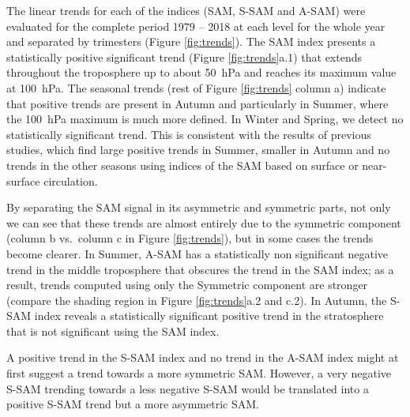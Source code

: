 \documentclass[smallextended]{svjour3}       %
\begin{document}
The linear trends for each of the indices (SAM, S\nobreakdash-SAM and A\nobreakdash-SAM) were evaluated for the complete period 1979 -- 2018 at each level for the whole year and separated by trimesters (Figure \ref{fig:trends}).
The SAM index presents a statistically positive significant trend (Figure \ref{fig:trends}a.1) that extends throughout the troposphere up to about 50~hPa and reaches its maximum value at 100~hPa.
The seasonal trends (rest of Figure \ref{fig:trends} column a) indicate that positive trends are present in Autumn and particularly in Summer, where the 100~hPa maximum is much more defined.
In Winter and Spring, we detect no statistically significant trend.
This is consistent with the results of previous studies, which find large positive trends in Summer, smaller in Autumn and no trends in the other seasons \citep[e.g.][ and references therein]{fogt2020} using indices of the SAM based on surface or near-surface circulation.

By separating the SAM signal in its asymmetric and symmetric parts, not only we can see that these trends are almost entirely due to the symmetric component (column b vs.~column c in Figure \ref{fig:trends}), but in some cases the trends become clearer.
In Summer, A\nobreakdash-SAM has a statistically non significant negative trend in the middle troposphere that obscures the trend in the SAM index; as a result, trends computed using only the Symmetric component are stronger (compare the shading region in Figure \ref{fig:trends}a.2 and c.2).
In Autumn, the S\nobreakdash-SAM index reveals a statistically significant positive trend in the stratosphere that is not significant using the SAM index.

A positive trend in the S\nobreakdash-SAM index and no trend in the A\nobreakdash-SAM index might at first suggest a trend towards a more symmetric SAM.
However, a very negative S\nobreakdash-SAM trending towards a less negative S\nobreakdash-SAM would be translated into a positive S\nobreakdash-SAM trend but a more asymmetric SAM.
\end{document}
